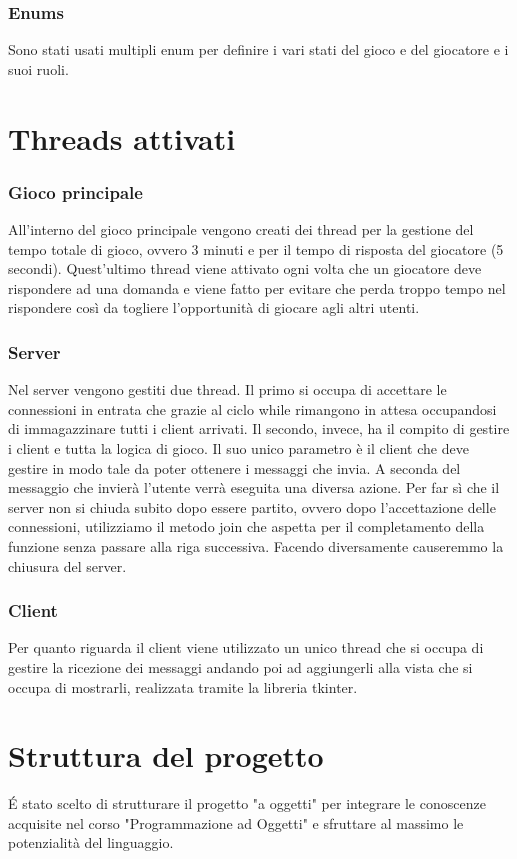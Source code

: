 \documentclass[a4paper,12pt]{report}
\begin{document}
\subsection{Enums}
Sono stati usati multipli enum per definire i vari stati del gioco e del giocatore e i suoi ruoli.

\chapter{Threads attivati}
\subsection{Gioco principale}
All'interno del gioco principale vengono creati dei thread per la gestione del tempo totale di gioco, ovvero 3 minuti e per il tempo di risposta del giocatore (5 secondi). Quest'ultimo thread viene attivato ogni volta che un giocatore deve rispondere ad una domanda e viene fatto per evitare che perda troppo tempo nel rispondere così da togliere l'opportunità di giocare agli altri utenti.

\subsection{Server}
Nel server vengono gestiti due thread. Il primo si occupa di accettare le connessioni in entrata che grazie al ciclo while rimangono in attesa occupandosi di immagazzinare tutti i client arrivati. Il secondo, invece, ha il compito di gestire i client e tutta la logica di gioco. Il suo unico parametro è il client che deve gestire in modo tale da poter ottenere i messaggi che invia. A seconda del messaggio che invierà l'utente verrà eseguita una diversa azione.
Per far sì che il server non si chiuda subito dopo essere partito, ovvero dopo l'accettazione delle connessioni, utilizziamo il metodo join che aspetta per il completamento della funzione senza passare alla riga successiva. Facendo diversamente causeremmo la chiusura del server.

\subsection{Client}
Per quanto riguarda il client viene utilizzato un unico thread che si occupa di gestire la ricezione dei messaggi andando poi ad aggiungerli alla vista che si occupa di mostrarli, realizzata tramite la libreria tkinter.

\chapter{Struttura del progetto}
É stato scelto di strutturare il progetto "a oggetti" per integrare le conoscenze acquisite nel corso "Programmazione ad Oggetti" e sfruttare al massimo le potenzialità del linguaggio.
\end{document}
